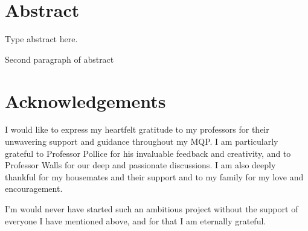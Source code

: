 
\newpage %
\setcounter{page}{1} %

\section*{Abstract} %

\noindent Type abstract here. %
\par Second paragraph of abstract %

\newpage %
\section*{Acknowledgements} %
I would like to express my heartfelt gratitude to my professors for their unwavering support and guidance throughout my MQP. I am particularly grateful to Professor Pollice for his invaluable feedback and creativity, and to Professor Walls for our deep and passionate discussions. I am also deeply thankful for my housemates and their support and to my family for my love and encouragement.

I'm would never have started such an ambitious project without the support of everyone I have mentioned above, and for that I am eternally grateful. 


\newpage %
\tableofcontents %
\listoftables %
\listoffigures %

